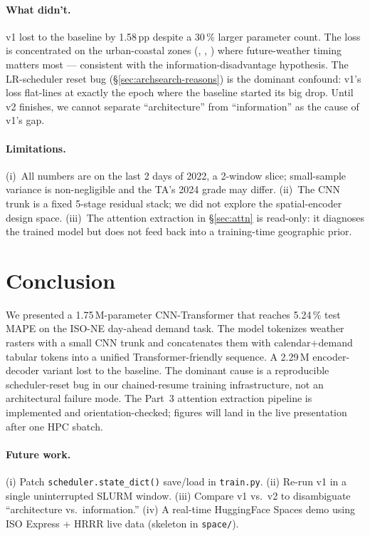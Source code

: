 \documentclass[11pt,letterpaper]{article}
\begin{document}
\paragraph{What didn't.} v1 lost to the baseline by 1.58\,pp despite a 30\,\% larger parameter count. The loss is concentrated on the urban-coastal zones (, , ) where future-weather timing matters most --- consistent with the information-disadvantage hypothesis. The LR-scheduler reset bug (\S\ref{sec:archsearch-reasons}) is the dominant confound: v1's loss flat-lines at exactly the epoch where the baseline started its big drop. Until v2 finishes, we cannot separate ``architecture'' from ``information'' as the cause of v1's gap.

\paragraph{Limitations.} (i)~All numbers are on the last 2 days of 2022, a 2-window slice; small-sample variance is non-negligible and the TA's 2024 grade may differ. (ii)~The CNN trunk is a fixed 5-stage residual stack; we did not explore the spatial-encoder design space. (iii)~The attention extraction in \S\ref{sec:attn} is read-only: it diagnoses the trained model but does not feed back into a training-time geographic prior.

\section{Conclusion}
\label{sec:conclusion}

We presented a 1.75\,M-parameter CNN-Transformer that reaches 5.24\,\% test MAPE on the ISO-NE day-ahead demand task. The model tokenizes weather rasters with a small CNN trunk and concatenates them with calendar+demand tabular tokens into a unified Transformer-friendly sequence. A 2.29\,M encoder-decoder variant lost to the baseline. The dominant cause is a reproducible scheduler-reset bug in our chained-resume training infrastructure, not an architectural failure mode. The Part~3 attention extraction pipeline is implemented and orientation-checked; figures will land in the live presentation after one HPC sbatch.

\paragraph{Future work.} (i) Patch \texttt{scheduler.state\_dict()} save/load in \texttt{train.py}. (ii) Re-run v1 in a single uninterrupted SLURM window. (iii) Compare v1 vs.\ v2 to disambiguate ``architecture vs.\ information.'' (iv) A real-time HuggingFace Spaces demo using ISO Express + HRRR live data (skeleton in \texttt{space/}).
\end{document}

